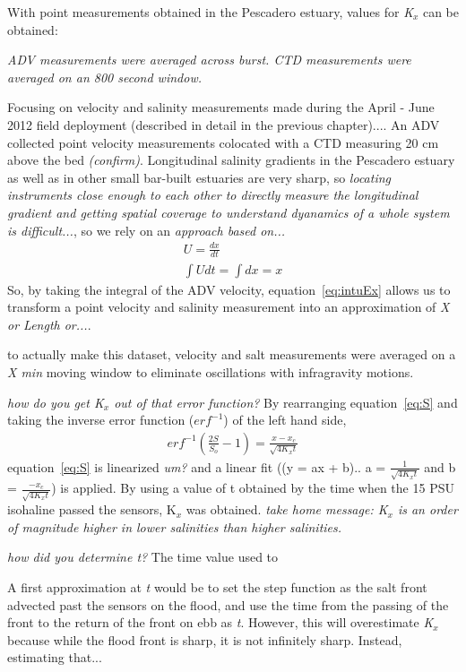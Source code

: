 With point measurements obtained in the Pescadero estuary, values for \emph{K$_x$} can be obtained: 

\emph{ADV measurements were averaged across burst. CTD measurements were averaged on an 800 second window.}

Focusing on velocity and salinity measurements made during the April - June 2012 field deployment (described in detail in the previous chapter).... An ADV collected point velocity measurements colocated with a CTD measuring 20 cm above the bed \emph{(confirm)}. Longitudinal salinity gradients in the Pescadero estuary as well as in other small bar-built estuaries are very sharp, so \emph{locating instruments close enough to each other to directly measure the longitudinal gradient and getting spatial coverage to understand dyanamics of a whole system is difficult...}, so we rely on an \emph{approach based on...}
\begin{eqnarray}
U = \frac{dx}{dt} \label{eq:uEdxdt}\\
\int{Udt} = \int{dx} = x \label{eq:intuEx}
\end{eqnarray}
So, by taking the integral of the ADV velocity, equation~\ref{eq:intuEx} allows us to transform a point velocity and salinity measurement into an approximation of \emph{X or Length or...}. 

to actually make this dataset, velocity and salt measurements were averaged on a \emph{X min} moving window to eliminate oscillations with infragravity motions. 

\emph{how do you get K$_x$ out of that error function?}
By rearranging equation~\ref{eq:S} and taking the inverse error function ($erf^{-1}$) of the left hand side, 
\begin{eqnarray}
erf^{-1}\left(\frac{2S}{S_o}-1\right) = \frac{x-x_c}{\sqrt{4K_xt}} \label{eq:linfitS}
\end{eqnarray}
equation~\ref{eq:S} is linearized \emph{um?} and a linear fit ((y = ax + b).. a = $\frac{1}{\sqrt{4K_xt}}$ and b = $\frac{-x_c}{\sqrt{4K_xt}}$) is applied. By using a value of t obtained by the time when the 15 PSU isohaline passed the sensors, K$_x$ was obtained.  \emph{take home message: K$_x$ is an order of magnitude higher in lower salinities than higher salinities. }


\emph{how did you determine t?}
The time value used to 

A first approximation at \emph{t} would be to set the step function as the salt front advected past the sensors on the flood, and use the time from the passing of the front to the return of the front on ebb as \emph{t}. However, this will overestimate \emph{K$_x$} because while the flood front is sharp, it is not infinitely sharp.  Instead, estimating that... 



